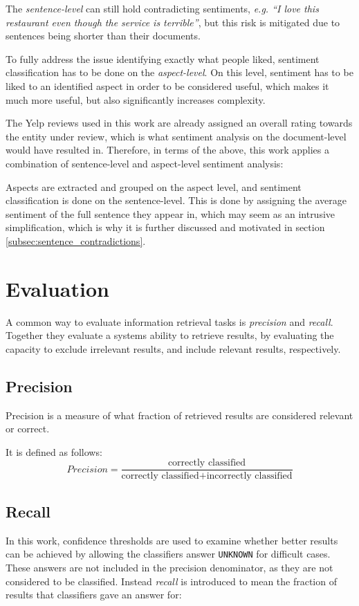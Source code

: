 \documentclass[a4paper,11pt]{kth-mag}
\begin{document}
The \emph{sentence-level} can still hold contradicting sentiments,
\emph{e.g. ``I love this restaurant even though the service is terrible''},
but this risk is mitigated due to sentences being shorter than their documents.

To fully address the issue identifying exactly what people liked,
sentiment classification has to be done on the \emph{aspect-level}.
On this level, sentiment has to be liked to an identified aspect in order to be considered
useful, which makes it much more useful, but also significantly increases complexity\cite[Chapter~1.2]{liu2012sentiment}.

The Yelp reviews used in this work are already assigned an overall rating towards the entity under
review, which is what sentiment analysis on the document-level would have resulted in.
Therefore, in terms of the above, this work applies a combination of sentence-level and aspect-level
sentiment analysis:

Aspects are extracted and grouped on the aspect level, and sentiment classification is done on
the sentence-level. This is done by assigning the average sentiment of the full sentence they appear in,
which may seem as an intrusive simplification, which is why it is
further discussed and motivated in section \ref{subsec:sentence_contradictions}.


\section{Evaluation}
A common way to evaluate information retrieval tasks is \emph{precision} and \emph{recall}. Together they evaluate a systems ability to retrieve results, by evaluating the capacity to exclude irrelevant results, and include relevant results, respectively.

\subsection{Precision}
Precision is a measure of what fraction of retrieved results are considered relevant or correct.

It is defined as follows:
\begin{equation} \label{eq:precision}
Precision = \frac{\text {correctly classified}}{\text{correctly classified} + \text{incorrectly classified}}
\end{equation}

\subsection{Recall}
In this work, confidence thresholds are used to examine whether better results can be achieved by
allowing the classifiers answer \texttt{UNKNOWN} for difficult cases. These answers are not included in
the precision denominator, as they are not considered to be classified.
Instead \emph{recall} is introduced to mean the fraction of results that classifiers gave an answer for:
\end{document}
